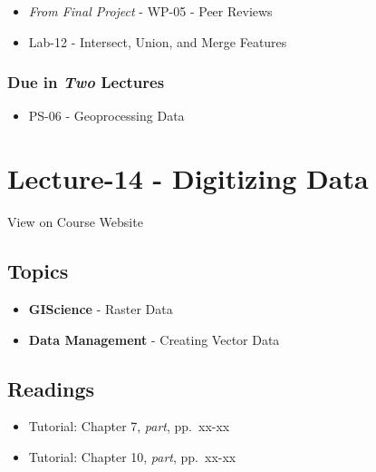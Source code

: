 \documentclass[]{book}
\providecommand{\tightlist}{%
  \setlength{\itemsep}{0pt}\setlength{\parskip}{0pt}}
\begin{document}
\begin{itemize}
\tightlist
\item
  \emph{From Final Project} - WP-05 - Peer Reviews
\item
  Lab-12 - Intersect, Union, and Merge Features
\end{itemize}

\hypertarget{due-in-two-lectures-5}{%
\subsubsection*{\texorpdfstring{Due in \emph{Two} Lectures}{Due in Two Lectures}}\label{due-in-two-lectures-5}}

\begin{itemize}
\tightlist
\item
  PS-06 - Geoprocessing Data
\end{itemize}

\hypertarget{lecture-14---digitizing-data}{%
\section*{Lecture-14 - Digitizing Data}\label{lecture-14---digitizing-data}}

View on Course Website

\hypertarget{topics-14}{%
\subsection*{Topics}\label{topics-14}}

\begin{itemize}
\tightlist
\item
  \textbf{GIScience} - Raster Data
\item
  \textbf{Data Management} - Creating Vector Data
\end{itemize}

\hypertarget{readings-14}{%
\subsection*{Readings}\label{readings-14}}

\begin{itemize}
\tightlist
\item
  Tutorial: Chapter 7, \emph{part}, pp.~xx-xx
\item
  Tutorial: Chapter 10, \emph{part}, pp.~xx-xx
\end{itemize}
\end{document}

